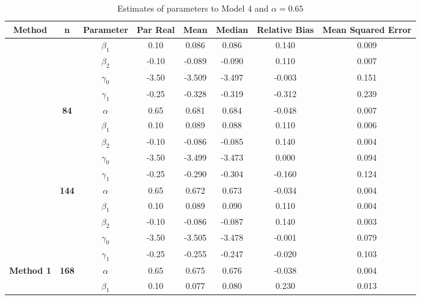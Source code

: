 \begin{table}[h]

\caption{\label{tab:Est_model_4_Alpha0.65}Estimates of parameters to Model 4 and $\alpha=0.65$}
\centering
\begin{tabular}[t]{>{}c>{}ccccccc}
\toprule
Method & n & Parameter & Par Real & Mean & Median & Relative Bias & Mean Squared Error\\
\midrule
 &  & $\beta_1$ & 0.10 & 0.086 & 0.086 & 0.140 & 0.009\\

 &  & $\beta_2$ & -0.10 & -0.089 & -0.090 & 0.110 & 0.007\\

 &  & $\gamma_0$ & -3.50 & -3.509 & -3.497 & -0.003 & 0.151\\

 &  & $\gamma_1$ & -0.25 & -0.328 & -0.319 & -0.312 & 0.239\\

 & \multirow{-5}{*}{\centering\arraybackslash \textbf{84}} & $\alpha$ & 0.65 & 0.681 & 0.684 & -0.048 & 0.007\\

 &  & $\beta_1$ & 0.10 & 0.089 & 0.088 & 0.110 & 0.006\\

 &  & $\beta_2$ & -0.10 & -0.086 & -0.085 & 0.140 & 0.004\\

 &  & $\gamma_0$ & -3.50 & -3.499 & -3.473 & 0.000 & 0.094\\

 &  & $\gamma_1$ & -0.25 & -0.290 & -0.304 & -0.160 & 0.124\\

 & \multirow{-5}{*}{\centering\arraybackslash \textbf{144}} & $\alpha$ & 0.65 & 0.672 & 0.673 & -0.034 & 0.004\\

 &  & $\beta_1$ & 0.10 & 0.089 & 0.090 & 0.110 & 0.004\\

 &  & $\beta_2$ & -0.10 & -0.086 & -0.087 & 0.140 & 0.003\\

 &  & $\gamma_0$ & -3.50 & -3.505 & -3.478 & -0.001 & 0.079\\

 &  & $\gamma_1$ & -0.25 & -0.255 & -0.247 & -0.020 & 0.103\\

\multirow{-15}{*}{\centering\arraybackslash \textbf{Method 1}} & \multirow{-5}{*}{\centering\arraybackslash \textbf{168}} & $\alpha$ & 0.65 & 0.675 & 0.676 & -0.038 & 0.004\\
\cmidrule{1-8}
 &  & $\beta_1$ & 0.10 & 0.077 & 0.080 & 0.230 & 0.013\\


\end{tabular}
\end{table}

